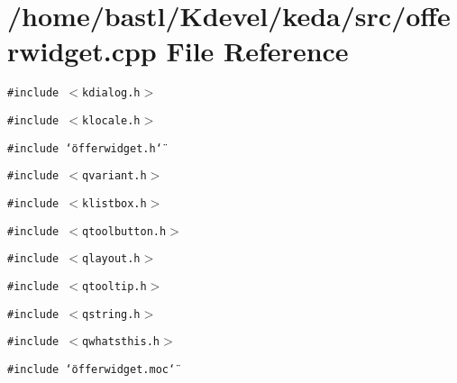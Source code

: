 \section{/home/bastl/Kdevel/keda/src/offerwidget.cpp File Reference}
\label{offerwidget_8cpp}
{\tt \#include $<$kdialog.h$>$}\par
{\tt \#include $<$klocale.h$>$}\par
{\tt \#include \char`\"{}offerwidget.h\char`\"{}}\par
{\tt \#include $<$qvariant.h$>$}\par
{\tt \#include $<$klistbox.h$>$}\par
{\tt \#include $<$qtoolbutton.h$>$}\par
{\tt \#include $<$qlayout.h$>$}\par
{\tt \#include $<$qtooltip.h$>$}\par
{\tt \#include $<$qstring.h$>$}\par
{\tt \#include $<$qwhatsthis.h$>$}\par
{\tt \#include \char`\"{}offerwidget.moc\char`\"{}}\par
